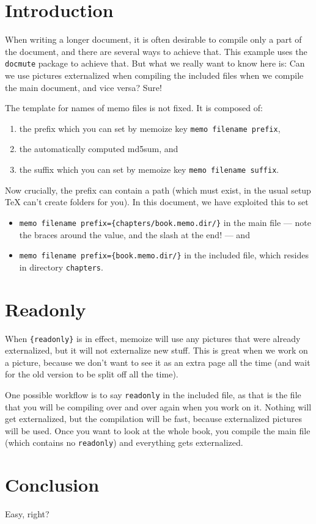 \documentclass{article}
\begin{document}
\section{Introduction}

When writing a longer document, it is often desirable to compile only a part of
the document, and there are several ways to achieve that. This example uses the
{\tt docmute} package to achieve that. But what we really want to know here is:
Can we use pictures externalized when compiling the included files when we
compile the main document, and vice versa?  Sure!

The template for names of memo files is not fixed. It is composed of:
\begin{enumerate}
\item the prefix which you can set by memoize key {\tt memo filename prefix}, 
\item the automatically computed md5sum, and
\item the suffix which you can set by memoize key {\tt memo filename suffix}.
\end{enumerate}
Now crucially, the prefix can contain a path (which must exist, in the usual
  setup TeX can't create folders for you). In this document, we have exploited
this to set
\begin{itemize}
\item {\tt memo filename prefix=\{chapters/book.memo.dir/\}} in the main file
  --- note the braces around the value, and the slash at the end! --- and
\item {\tt memo filename prefix=\{book.memo.dir/\}} in the included file, which
  resides in directory {\tt chapters}.
\end{itemize}



\section{Readonly}

When {\tt \string\memoize\{readonly\}} is in effect, memoize will use any
pictures that were already externalized, but it will not externalize new stuff.
This is great when we work on a picture, because we don't want to see it as an
extra page all the time (and wait for the old version to be split off all the
  time).

One possible workflow is to say {\tt readonly} in the included file, as that is
the file that you will be compiling over and over again when you work on it.
Nothing will get externalized, but the compilation will be fast, because
externalized pictures will be used.  Once you want to look at the whole book,
you compile the main file (which contains no {\tt readonly}) and everything
gets externalized.

\section{Conclusion}

Easy, right?
\end{document}
